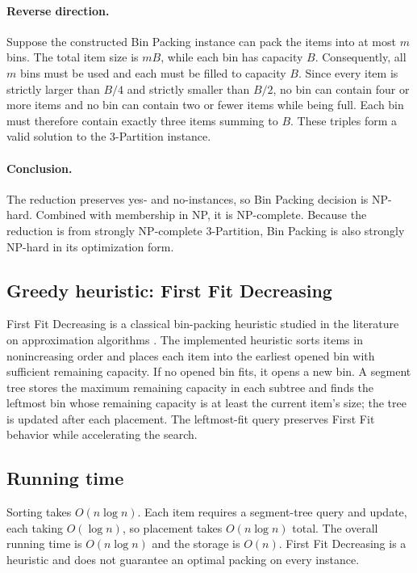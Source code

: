 \paragraph{Reverse direction.}
Suppose the constructed Bin Packing instance can pack the items into at
most $m$ bins. The total item size is $mB$, while each bin has capacity
$B$. Consequently, all $m$ bins must be used and each must be filled to
capacity $B$. Since every item is strictly larger than $B/4$ and
strictly smaller than $B/2$, no bin can contain four or more items and
no bin can contain two or fewer items while being full. Each bin must
therefore contain exactly three items summing to $B$. These triples form
a valid solution to the 3-Partition instance.

\paragraph{Conclusion.}
The reduction preserves yes- and no-instances, so Bin Packing decision is
NP-hard. Combined with membership in NP, it is NP-complete. Because the
reduction is from strongly NP-complete 3-Partition, Bin Packing is also
strongly NP-hard in its optimization form.

\subsection{Greedy heuristic: First Fit Decreasing}
First Fit Decreasing is a classical bin-packing heuristic
studied in the literature on approximation algorithms
\cite{johnson1974}.
The implemented heuristic sorts items in nonincreasing order and places
each item into the earliest opened bin with sufficient remaining capacity.
If no opened bin fits, it opens a new bin. A segment tree stores the
maximum remaining capacity in each subtree and finds the leftmost bin
whose remaining capacity is at least the current item's size; the tree is
updated after each placement. The leftmost-fit query preserves First Fit
behavior while accelerating the search.

\subsection{Running time}
Sorting takes $O(n\log n)$. Each item requires a segment-tree query and
update, each taking $O(\log n)$, so placement takes $O(n\log n)$ total.
The overall running time is $O(n\log n)$ and the storage is $O(n)$.
First Fit Decreasing is a heuristic and does not guarantee an optimal
packing on every instance.